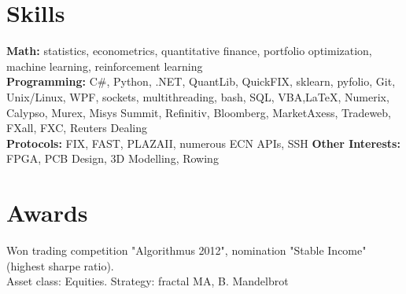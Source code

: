 \documentclass[letterpaper,hidelinks]{article}
\newcommand{\resumeSubHeadingListStart}{\begin{itemize}[leftmargin=0.1in, label={}]}
\newcommand{\resumeSubHeadingListEnd}{\end{itemize}}
\begin{document}
\section{Skills}
\resumeSubHeadingListStart
\small{\item{
              \textbf{{Math:}}{ statistics, econometrics, quantitative finance, portfolio optimization, machine learning, reinforcement learning\\} %
              \textbf{{Programming:}}{ C\#, Python, .NET, QuantLib, QuickFIX, sklearn, pyfolio, Git, Unix/Linux, WPF, sockets, multithreading, bash, SQL, VBA,\LaTeX, Numerix, Calypso, Murex, Misys Summit, Refinitiv, Bloomberg, MarketAxess, Tradeweb, FXall, FXC, Reuters Dealing\\} %
              \textbf{{Protocols:}}{ FIX, FAST, PLAZAII, numerous ECN APIs, SSH } %
              \textbf{{Other Interests:}}{ FPGA, PCB Design, 3D Modelling, Rowing} %
        }}

\resumeSubHeadingListEnd
\vspace{-12pt}
\section{Awards}
\begin{description}%
  \item{Won trading competition "Algorithmus 2012", nomination "Stable Income" (highest sharpe ratio). \\Asset class: Equities. Strategy: fractal MA, B. Mandelbrot}  
\vspace{-3pt}
\end{description}
\end{document}
